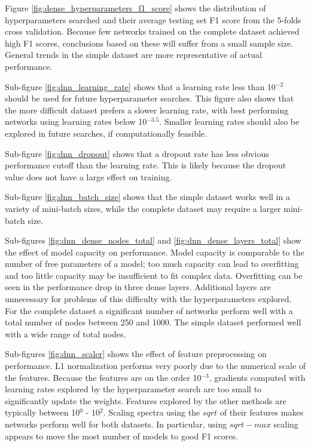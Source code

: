 Figure \ref{fig:dense_hyperparameters_f1_score} shows the distribution of hyperparameters searched and their average testing set F1 score from the 5-folds cross validation. Because few networks trained on the complete dataset achieved high F1 scores, conclusions based on these will suffer from a small sample size. General trends in the simple dataset are more representative of actual performance. 

Sub-figure \ref{fig:dnn_learning_rate} shows that a learning rate less than 10$^{-2}$ should be used for future hyperparameter searches. This figure also shows that the more difficult dataset prefers a slower learning rate, with best performing networks using learning rates below 10$^{-3.5}$. Smaller learning rates should also be explored in future searches, if computationally feasible.

Sub-figure \ref{fig:dnn_dropout} shows that a dropout rate has less obvious performance cutoff than the learning rate. This is likely because the dropout value does not have a large effect on training.

Sub-figure \ref{fig:dnn_batch_size} shows that the simple dataset works well in a variety of mini-batch sizes, while the complete dataset may require a larger mini-batch size.

Sub-figures \ref{fig:dnn_dense_nodes_total} and \ref{fig:dnn_dense_layers_total} show the effect of model capacity on performance. Model capacity is comparable to the number of free parameters of a model; too much capacity can lead to overfitting and too little capacity may be insufficient to fit complex data. Overfitting can be seen in the performance drop in three dense layers. Additional layers are unnecessary for problems of this difficulty with the hyperparameters explored. For the complete dataset a significant number of networks perform well with a total number of nodes between 250 and 1000. The simple dataset performed well with a wide range of total nodes.

Sub-figures \ref{fig:dnn_scaler} shows the effect of feature preprocessing on performance. L1 normalization performs very poorly due to the numerical scale of the features. Because the features are on the order 10$^{-3}$, gradients computed with learning rates explored by the hyperparameter search are too small to significantly update the weights. Features explored by the other methods are typically between 10$^{0}$ - 10$^{2}$. Scaling spectra using the $sqrt$ of their features makes networks perform well for both datasets. In particular, using $sqrt-max$ scaling appears to move the most number of models to good F1 scores.


